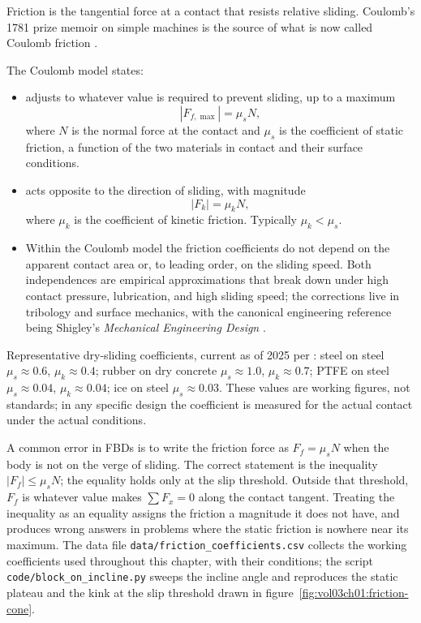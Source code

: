 Friction is the tangential force at a contact that resists relative
sliding. Coulomb's 1781 prize memoir on simple machines is the source
of what is now called Coulomb friction
\cite{hist:coulomb1781}.

The Coulomb model states:

\begin{itemize}[leftmargin=*]
  \item {} adjusts to whatever value is
    required to prevent sliding, up to a maximum
    \[
    |F_{f,\max}| = \mu_s N,
    \]
    where $N$ is the normal force at the contact and $\mu_s$ is the
    coefficient of static friction, a function of the two materials
    in contact and their surface conditions.
  \item {} acts opposite to the direction of
    sliding, with magnitude
    \[
    |F_k| = \mu_k N,
    \]
    where $\mu_k$ is the coefficient of kinetic friction. Typically
    $\mu_k < \mu_s$.
  \item Within the Coulomb model the friction coefficients do not
    depend on the apparent contact area or, to leading order, on the
    sliding speed. Both independences are empirical approximations
    that break down under high contact pressure, lubrication, and
    high sliding speed; the corrections live in tribology and
    surface mechanics, with the canonical engineering reference being
    Shigley's \emph{Mechanical Engineering Design}
    \cite[ch.~7--8]{text:shigley2020}.
\end{itemize}



Representative dry-sliding coefficients, current as of 2025 per
\textcite{text:meriam-kraige2018}: steel on steel
$\mu_s \approx 0.6$, $\mu_k \approx 0.4$; rubber on dry concrete
$\mu_s \approx 1.0$, $\mu_k \approx 0.7$; PTFE on steel
$\mu_s \approx 0.04$, $\mu_k \approx 0.04$; ice on steel
$\mu_s \approx 0.03$. These values are working figures, not standards;
in any specific design the coefficient is measured for the actual
contact under the actual conditions.

A common error in FBDs is to write the friction force as $F_f = \mu_s
N$ when the body is not on the verge of sliding. The correct statement
is the inequality $|F_f| \le \mu_s N$; the equality holds only at the
slip threshold. Outside that threshold, $F_f$ is whatever value makes
$\sum F_x = 0$ along the contact tangent. Treating the inequality as
an equality assigns the friction a magnitude it does not have, and
produces wrong answers in problems where the static friction is
nowhere near its maximum. The data file
\texttt{data/friction\_coefficients.csv} collects the working
coefficients used throughout this chapter, with their conditions; the
script \texttt{code/block\_on\_incline.py} sweeps the incline angle and
reproduces the static plateau and the kink at the slip threshold drawn
in figure~\ref{fig:vol03ch01:friction-cone}.

